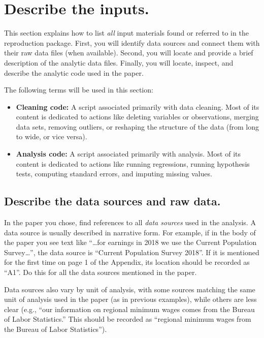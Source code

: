 \documentclass[]{book}
\begin{document}
\hypertarget{describe-inputs}{%
\section{Describe the inputs.}\label{describe-inputs}}

This section explains how to list \emph{all} input materials found or referred to in the reproduction package. First, you will identify data sources and connect them with their raw data files (when available). Second, you will locate and provide a brief description of the analytic data files. Finally, you will locate, inspect, and describe the analytic code used in the paper.

The following terms will be used in this section:

\begin{itemize}
\item
  \textbf{Cleaning code:} A script associated primarily with data cleaning. Most of its content is dedicated to actions like deleting variables or observations, merging data sets, removing outliers, or reshaping the structure of the data (from long to wide, or vice versa).
\item
  \textbf{Analysis code:} A script associated primarily with analysis. Most of its content is dedicated to actions like running regressions, running hypothesis tests, computing standard errors, and imputing missing values.
\end{itemize}

\hypertarget{desc-sourc}{%
\subsection{Describe the data sources and raw data.}\label{desc-sourc}}

In the paper you chose, find references to all \emph{data sources} used in the analysis. A data source is usually described in narrative form. For example, if in the body of the paper you see text like ``\ldots{}for earnings in 2018 we use the Current Population Survey\ldots{}'', the data source is ``Current Population Survey 2018''. If it is mentioned for the first time on page 1 of the Appendix, its location should be recorded as ``A1''. Do this for all the data sources mentioned in the paper.

Data sources also vary by unit of analysis, with some sources matching the same unit of analysis used in the paper (as in previous examples), while others are less clear (e.g., ``our information on regional minimum wages comes from the Bureau of Labor Statistics.'' This should be recorded as ``regional minimum wages from the Bureau of Labor Statistics'').
\end{document}
